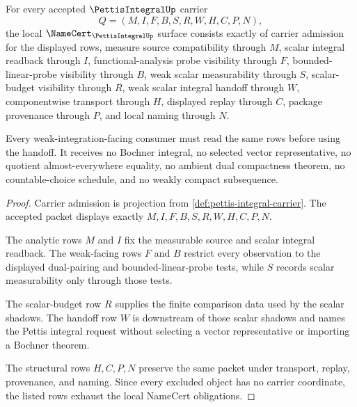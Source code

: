 \begin{theorem}
\label{thm:pettis-integral-namecert-obligations}
For every accepted $\PettisIntegralUp$ carrier
$$
Q=(M,I,F,B,S,R,W,H,C,P,N),
$$
the local $\NameCert_{\PettisIntegralUp}$ surface consists exactly of carrier admission for the displayed rows, measure source compatibility through $M$, scalar integral readback through $I$, functional-analysis probe visibility through $F$, bounded-linear-probe visibility through $B$, weak scalar measurability through $S$, scalar-budget visibility through $R$, weak scalar integral handoff through $W$, componentwise transport through $H$, displayed replay through $C$, package provenance through $P$, and local naming through $N$.

Every weak-integration-facing consumer must read the same rows before using the handoff. It receives no Bochner integral, no selected vector representative, no quotient almost-everywhere equality, no ambient dual compactness theorem, no countable-choice schedule, and no weakly compact subsequence.
\end{theorem}
\begin{proof}
Carrier admission is projection from \autoref{def:pettis-integral-carrier}. The accepted packet displays exactly $M,I,F,B,S,R,W,H,C,P,N$.

The analytic rows $M$ and $I$ fix the measurable source and scalar integral readback. The weak-facing rows $F$ and $B$ restrict every observation to the displayed dual-pairing and bounded-linear-probe tests, while $S$ records scalar measurability only through those tests.

The scalar-budget row $R$ supplies the finite comparison data used by the scalar shadows. The handoff row $W$ is downstream of those scalar shadows and names the Pettis integral request without selecting a vector representative or importing a Bochner theorem.

The structural rows $H,C,P,N$ preserve the same packet under transport, replay, provenance, and naming. Since every excluded object has no carrier coordinate, the listed rows exhaust the local NameCert obligations.
\end{proof}

